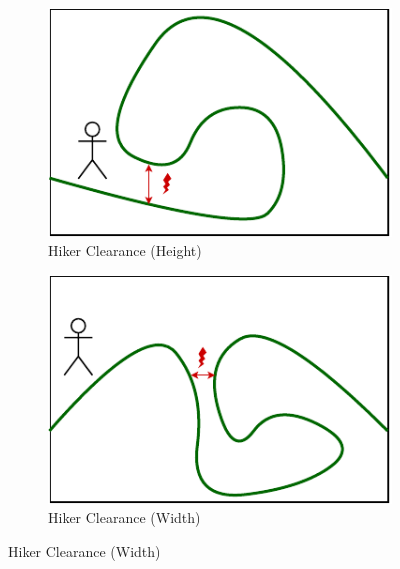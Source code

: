 \begin{figure}[htbp]
  \vspace{.5cm}
  \begin{subfigure}{.5\linewidth}
    \centering
    \includegraphics[width=.948\linewidth]{figures/constraints/HikerClearanceHeight.pdf}
    \caption{Hiker Clearance (Height)}
    \label{pic:hikerClearanceHeight}
  \end{subfigure}%
  \begin{subfigure}{.5\linewidth}
    \centering
    \includegraphics[width=.948\linewidth]{figures/constraints/HikerClearanceWidth.pdf}
    \caption{Hiker Clearance (Width)}
    \label{pic:hikerClearanceWidth}
  \end{subfigure}


\end{figure}
